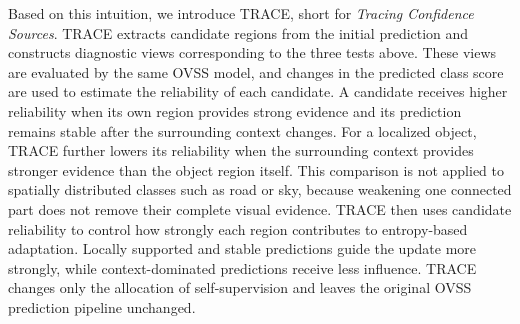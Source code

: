 \documentclass[letterpaper]{article}
\newcommand{\method}{TRACE\xspace}
\newcommand{\Description}[1]{}
\begin{document}
	
	Based on this intuition, we introduce \method, short for \emph{Tracing Confidence Sources}. TRACE extracts candidate regions from the initial prediction and constructs diagnostic views corresponding to the three tests above. These views are evaluated by the same OVSS model, and changes in the predicted class score are used to estimate the reliability of each candidate. A candidate receives higher reliability when its own region provides strong evidence and its prediction remains stable after the surrounding context changes. For a localized object, TRACE further lowers its reliability when the surrounding context provides stronger evidence than the object region itself. This comparison is not applied to spatially distributed classes such as road or sky, because weakening one connected part does not remove their complete visual evidence. TRACE then uses candidate reliability to control how strongly each region contributes to entropy-based adaptation. Locally supported and stable predictions guide the update more strongly, while context-dominated predictions receive less influence. TRACE changes only the allocation of self-supervision and leaves the original OVSS prediction pipeline unchanged.
	
\end{document}
